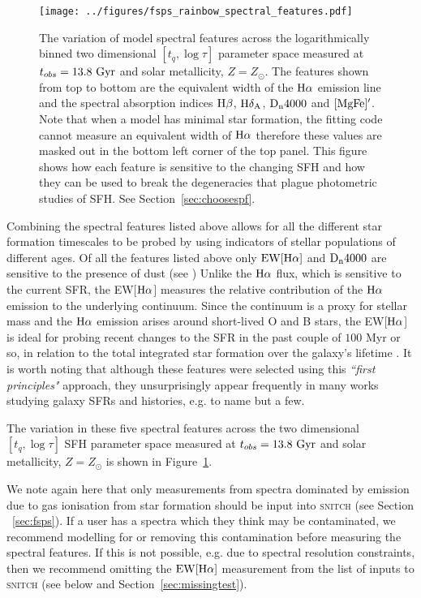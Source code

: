 \documentclass[useAMS,usenatbib]{mn2e}
\def\referee		{\color{refer}}
\def\refereeii		{\color{refer2}}
\begin{document}
\begin{figure}
\centering
\texttt{[image: ../figures/fsps\_rainbow\_spectral\_features.pdf]}
\caption{The variation of model spectral features across the logarithmically binned two dimensional $[t_q, \log \tau]$ parameter space measured at $t_{obs}=13.8~\rm{Gyr}$ and solar metallicity, $Z=Z_{\odot}$. The features shown from top to bottom are the equivalent width of the $\rm{H}\alpha$ emission line and the spectral absorption indices $\rm{H}\beta$, $\rm{H}\delta_A$, $\rm{D}_n4000$ and $[\rm{MgFe}]^{\prime}$. Note that when a model has minimal star formation, the fitting code cannot measure an equivalent width of $\rm{H}\alpha$ therefore these values are masked out in the bottom left corner of the top panel. This figure shows how each feature is sensitive to the changing SFH and how they can be used to break the degeneracies that plague photometric studies of SFH. See Section~\ref{sec:choosespf}.}
\label{fig:rainbow}
\end{figure}

{\referee Combining the spectral features listed above allows for all the different star formation timescales to be probed by using indicators of stellar populations of different ages. Of all the features listed above only $\rm{EW}[\rm{H}\alpha]$ and $\rm{D}_n4000$ are sensitive to the presence of dust (see \citealt{balogh99})} {\referee Unlike the $\rm{H}\alpha$ flux, which is sensitive to the current SFR, the EW[$\rm{H}\alpha$] measures the relative contribution of the $\rm{H}\alpha$ emission to the underlying continuum. Since the continuum is a proxy for stellar mass and the $\rm{H}\alpha$ emission arises around short-lived O and B stars, the EW[$\rm{H}\alpha$] is ideal for probing recent changes to the SFR in the past couple of $100$ Myr or so, in relation to the total integrated star formation over the galaxy’s lifetime \citep[see also][]{li15, zick18}.} It is worth noting that although these features were selected using this \emph{``first principles"} approach, they unsurprisingly appear frequently in many works studying galaxy SFRs and histories, e.g. \cite{kauffmann03, brinchmann04, goto05b, moustakas06, martin07, huang13, li15, wang18, spindler18, zick18} to name but a few. 

The variation in these five spectral features across the two dimensional $[t_q, \log \tau]$ SFH parameter space measured at $t_{obs}=13.8~\rm{Gyr}$ and solar metallicity, $Z=Z_{\odot}$ is shown in Figure~\ref{fig:rainbow}.

{\refereeii We note again here that only measurements from spectra dominated by emission due to gas ionisation from star formation should be input into \textsc{snitch} (see Section ~\ref{sec:fsps}). If a user has a spectra which they think may be contaminated, we recommend modelling for or removing this contamination before measuring the spectral features. If this is not possible, e.g. due to spectral resolution constraints, then we recommend omitting the $\rm{EW}[\rm{H}\alpha]$ measurement from the list of inputs to \textsc{snitch} (see below and Section~\ref{sec:missingtest}).}
\end{document}
